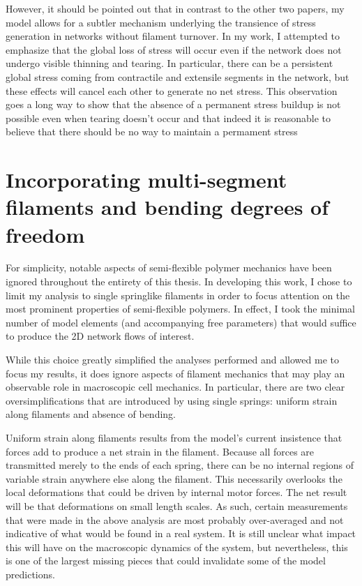 However, it should be pointed out that in contrast to the other two papers, my model allows for a subtler mechanism underlying the transience of stress generation in networks without filament turnover.  In my work, I attempted to emphasize that the global loss of stress will occur even if the network does not undergo visible thinning and tearing. In particular, there can be a persistent global stress coming from contractile and extensile segments in the network, but these effects will cancel each other to generate no net stress.  This observation goes a long way to show that the absence of a permanent stress buildup is not possible even when tearing doesn't occur and that indeed it is reasonable to believe that there should be no way to maintain a permament stress 

\section{Incorporating multi-segment filaments and bending degrees of freedom}
For simplicity, notable aspects of semi-flexible polymer mechanics have been ignored throughout the entirety of this thesis.  In developing this work, I chose to limit my analysis to single springlike filaments in order to focus attention on the most prominent properties of semi-flexible polymers. In effect, I took the minimal number of model elements (and accompanying free parameters) that would suffice to produce the 2D network flows of interest. 

While this choice greatly simplified the analyses performed and allowed me to focus my results, it does ignore aspects of filament mechanics that may play an observable role in macroscopic cell mechanics.  In particular, there are two clear oversimplifications that are introduced by using single springs: uniform strain along filaments and absence of bending.

Uniform strain along filaments results from the model's current insistence that forces add to produce a net strain in the filament.  Because all forces are transmitted merely to the ends of each spring, there can be no internal regions of variable strain anywhere else along the filament.  This necessarily overlooks the local deformations that could be driven by internal motor forces.  The net result will be that deformations on small length scales.    As such, certain measurements that were made in the above analysis are most probably over-averaged and not indicative of what would be found in a real system.  It is still unclear what impact this will have on the macroscopic dynamics of the system, but nevertheless, this is one of the largest missing pieces that could invalidate some of the model predictions.

